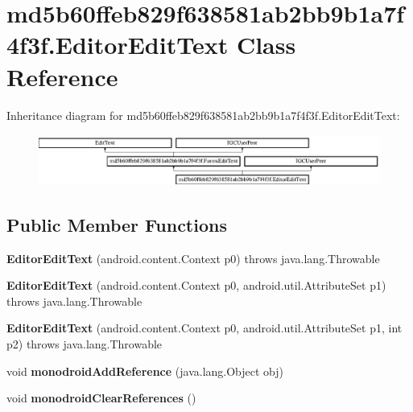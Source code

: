 \hypertarget{classmd5b60ffeb829f638581ab2bb9b1a7f4f3f_1_1EditorEditText}{}\section{md5b60ffeb829f638581ab2bb9b1a7f4f3f.\+Editor\+Edit\+Text Class Reference}
\label{classmd5b60ffeb829f638581ab2bb9b1a7f4f3f_1_1EditorEditText}
Inheritance diagram for md5b60ffeb829f638581ab2bb9b1a7f4f3f.\+Editor\+Edit\+Text\+:\begin{figure}[H]
\begin{center}
\leavevmode
\includegraphics[height=1.686747cm]{classmd5b60ffeb829f638581ab2bb9b1a7f4f3f_1_1EditorEditText}
\end{center}
\end{figure}
\subsection*{Public Member Functions}
\begin{DoxyCompactItemize}
\item 
\mbox{\label{classmd5b60ffeb829f638581ab2bb9b1a7f4f3f_1_1EditorEditText_af867d7b8157b5de4238185bf6f6676bf}} 
{\bfseries Editor\+Edit\+Text} (android.\+content.\+Context p0)  throws java.\+lang.\+Throwable 	
\item 
\mbox{\label{classmd5b60ffeb829f638581ab2bb9b1a7f4f3f_1_1EditorEditText_acecda8e695b3aabe8c8cf239e9a086c4}} 
{\bfseries Editor\+Edit\+Text} (android.\+content.\+Context p0, android.\+util.\+Attribute\+Set p1)  throws java.\+lang.\+Throwable 	
\item 
\mbox{\label{classmd5b60ffeb829f638581ab2bb9b1a7f4f3f_1_1EditorEditText_a0f6e1c351c540635b51c75ed5cc7ef59}} 
{\bfseries Editor\+Edit\+Text} (android.\+content.\+Context p0, android.\+util.\+Attribute\+Set p1, int p2)  throws java.\+lang.\+Throwable 	
\item 
\mbox{\label{classmd5b60ffeb829f638581ab2bb9b1a7f4f3f_1_1EditorEditText_a2d346ebbcec03d19cb05949a57c42ca2}} 
void {\bfseries monodroid\+Add\+Reference} (java.\+lang.\+Object obj)
\item 
\mbox{\label{classmd5b60ffeb829f638581ab2bb9b1a7f4f3f_1_1EditorEditText_aacf56440a58971488b7292ee85983d77}} 
void {\bfseries monodroid\+Clear\+References} ()
\end{DoxyCompactItemize}
